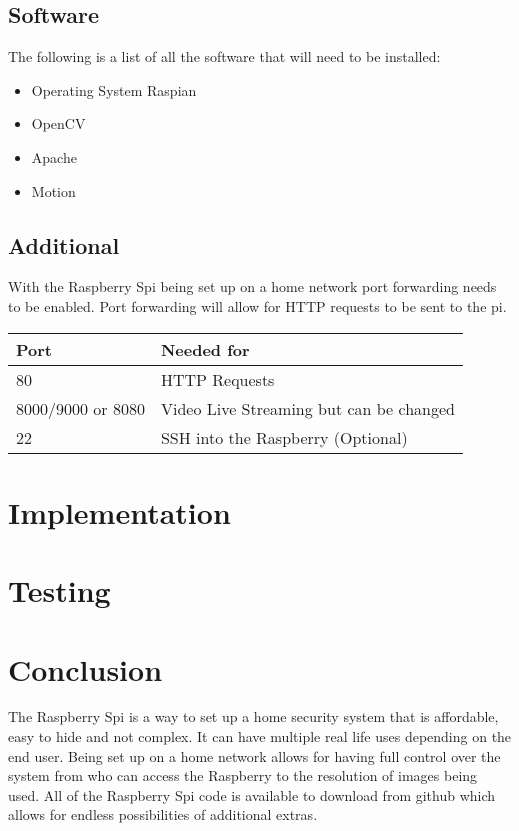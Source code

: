 \documentclass[]{report}   %
\begin{document}
\section {Software}	
\label {sec:software}	
The following is a list of all the software that will need to be installed:
\begin {itemize}

  \item Operating System Raspian 
  \item OpenCV
  \item Apache
  \item Motion

\end {itemize}

\section {Additional}	
\label {sec:additional}
With the Raspberry Spi being set up on a home network port forwarding needs to be enabled. Port forwarding will allow for HTTP requests to be sent to the pi. 
%
\begin{center}
    \begin{tabular}{ | l | p{7cm} |}
    \hline
    {\bf Port} & {\bf Needed for} \\ \hline
   80 & HTTP Requests \\ \hline 
   8000/9000 or 8080 & Video Live Streaming but can be changed\\ \hline
	22 & SSH into the Raspberry (Optional) \\ \hline
    \end{tabular}
\end{center}
%
%
\chapter {Implementation}
\label {ch:implem}
%
%
%
\chapter {Testing}
\label {ch:test}
%
%
%
%
%
\chapter {Conclusion}
\label {ch:concl}
%
%
%
%
%
\begin{small}
 The Raspberry Spi is a way to set up a home security system that is affordable, easy to hide and not complex. It can have multiple real life uses depending on the end user. Being set up on a home network allows for having full control over the system from who can access the Raspberry to the resolution of images being used. All of the Raspberry Spi code is available to download from github which allows for endless possibilities of additional extras.
\end{small}

\end{document}
